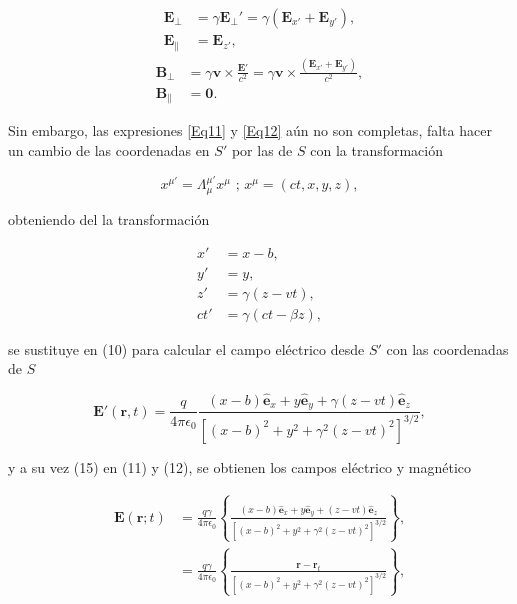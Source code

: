 \documentclass[a4paper,10pt]{article}
\begin{document}
\begin{subequations}
\begin{align}
\textbf{E}_{\bot}	&=\gamma\textbf{E}_{\bot}'=\gamma(\textbf{E}_{x'}+\textbf{E}_{y'}), \\
\textbf{E}_{\|}		&=\textbf{E}_{z'},
\end{align}
\label{Eq1.12}
\end{subequations}
\begin{subequations}
\begin{align}
\textbf{B}_{\bot}	&=\gamma\textbf{v}\times\frac{\textbf{E}'}{c^2}=\gamma\textbf{v}\times\frac{(\textbf{E}_{x'}+\textbf{E}_{y'})}{c^2},	\\
\textbf{B}_{\|}		&= \textbf{0}.
\end{align}
\label{Eq1.13}
\end{subequations}

Sin embargo, las expresiones \eqref{Eq11} y \eqref{Eq12} aún no son completas, falta hacer un cambio de las coordenadas en $S'$ por las de $S$ con la transformación

\begin{equation}
x^{\mu '}=\Lambda_{\mu}^{\mu '}x^{\mu} \text{		;		} x^{\mu}=(ct,x,y,z),
\end{equation}

obteniendo del la transformación

\begin{subequations}
\begin{align}
x'	&=	x-b,	\\
y'	&=	y,	\\
z'	&=	\gamma (z-vt),	\\
ct'	&=	\gamma (ct-\beta z),
\end{align}
\end{subequations}

se sustituye en (10) para calcular el campo eléctrico desde $S'$ con las coordenadas de $S$

\begin{equation}
\textbf{E}'(\textbf{r},t)=\frac{q}{4\pi \epsilon_0}\frac{(x-b)\hat{\textbf{e}}_x+y\hat{\textbf{e}}_y+\gamma (z-vt)\hat{\textbf{e}}_z}{[(x-b)^2+y^2+\gamma^2(z-vt)^2]^{3/2}},
\end{equation}

y a su vez (15) en (11) y (12), se obtienen los campos eléctrico y magnético

\begin{equation}
\begin{aligned}
\textbf{E}(\textbf{r};t)
	&=\frac{q\gamma}{4\pi \epsilon_0}\left\{\frac{(x-b)\hat{\textbf{e}}_x+y\hat{\textbf{e}}_y+(z-vt)\hat{\textbf{e}}_z}{[(x-b)^2+y^2+\gamma^2(z-vt)^2]^{3/2}}\right\},	\\
	&=\frac{q\gamma}{4\pi \epsilon_0}\left\{\frac{\textbf{r}-\textbf{r}_t}{[(x-b)^2+y^2+\gamma^2(z-vt)^2]^{3/2}}\right\},
\end{aligned}
\end{equation}
\end{document}

